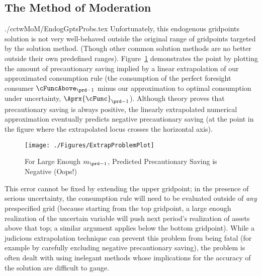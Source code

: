\documentclass[\econtexRoot/SolvingMicroDSOPs]{subfiles}
\begin{document}
\hypertarget{the-method-of-moderation}{}
\subsection{The Method of Moderation}\label{sec:method-of-moderation}

\begin{verbatimwrite}{./cctwMoM/EndogGptsProbs.tex}
  Unfortunately, this endogenous gridpoints solution is not very
  well-behaved outside the original range of gridpoints targeted by
  the solution method.  (Though other common solution methods are no
  better outside their own predefined ranges).
  Figure~\ref{fig:ExtrapProblem} demonstrates the point by plotting
  the amount of precautionary saving implied by a linear extrapolation
  of our approximated consumption rule (the consumption of the perfect
  foresight consumer $\cFuncAbove_{\prd-1}$ minus our approximation to
  optimal consumption under uncertainty, $\Aprx{\cFunc}_{\prd-1}$).
  Although theory proves that precautionary saving is always positive,
  the linearly extrapolated numerical approximation eventually
  predicts negative precautionary saving (at the point in the figure
  where the extrapolated locus crosses the horizontal axis).

  \hypertarget{ExtrapProblemPlot}{}
  \begin{figure}
    \texttt{[image: ./Figures/ExtrapProblemPlot]}
    \caption{For Large Enough ${m}_{\prd-1}$, Predicted Precautionary Saving is Negative (Oops!)}
    \label{fig:ExtrapProblem}
  \end{figure}

  This error cannot be fixed by extending the upper gridpoint; in the presence of serious uncertainty, the consumption rule will need to be evaluated outside of \textit{any} prespecified grid (because starting from the top gridpoint, a large enough realization of the uncertain variable will push next period's realization of assets above that top; a similar argument applies below the bottom gridpoint).  While a judicious extrapolation technique can prevent this problem from being fatal (for example by carefully excluding negative precautionary saving), the problem is often dealt with using inelegant methods whose implications for the accuracy of the solution are difficult to gauge.
\end{verbatimwrite}
\unskip


\end{document}
